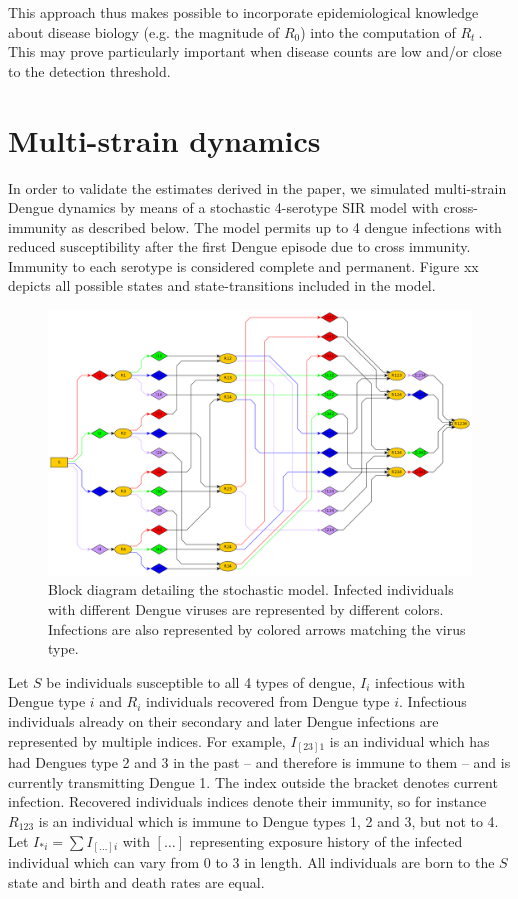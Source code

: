 \documentclass[12pt]{article}
\def \rr {$R_{t}\ $}
\begin{document}
This approach thus makes possible to incorporate epidemiological knowledge 
about disease biology (e.g. the magnitude of $R_0$) into the computation of \rr.
This may prove particularly important when disease counts are low and/or close 
to the detection threshold.
\newpage
\section*{Multi-strain dynamics}

In order to validate the estimates derived in the paper, we simulated 
multi-strain Dengue dynamics by means of a stochastic 4-serotype SIR model with 
cross-immunity as described below. 
The model permits up to 4 dengue infections 
with reduced susceptibility after the first Dengue episode due to cross 
immunity. 
Immunity to each serotype is considered complete and permanent. 
Figure xx depicts all possible states and state-transitions included in the 
model.

          \begin{figure}
 \centering
 \includegraphics[width=16cm]{Dengue4.png}

 \caption{Block diagram detailing the stochastic model. Infected individuals 
with different Dengue viruses are represented by different colors. Infections 
are also represented by colored arrows matching the virus type.}
 \label{fig:sde_blocks}
\end{figure}


Let $S$ be individuals susceptible to all 4 types of dengue, $I_i$ infectious 
with Dengue type $i$ and $R_i$ individuals recovered from Dengue type $i$. 
Infectious individuals already on their secondary and later Dengue infections 
are represented by multiple indices. For example, $I_{[23]1}$ is an individual 
which has had Dengues type 2 and 3 in the past -- and therefore is immune to 
them -- and is currently transmitting Dengue 1. 
The index outside the bracket 
denotes current infection. Recovered individuals indices denote their immunity, 
so for instance $R_{123}$ is an individual which is immune to Dengue types 1, 2 
and 3, but not to 4. Let $I_{*i} = \sum I_{[\ldots]i}$ with $[\ldots]$ 
representing exposure history of the infected individual which can vary from 0 
to 3 in length. 
All individuals are born to the $S$ state and birth and death 
rates are equal.
\end{document}
